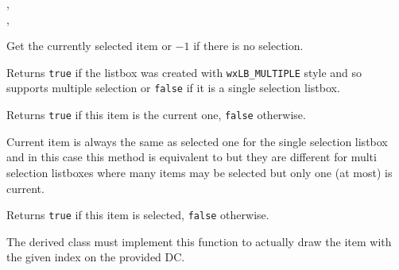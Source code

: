 
,\\
,\\


\label{wxvlistboxgetselection}


Get the currently selected item or $-1$ if there is no selection.


\label{wxvlistboxishasmultipleselection}


Returns {\tt true} if the listbox was created with {\tt wxLB\_MULTIPLE} style
and so supports multiple selection or {\tt false} if it is a single selection
listbox.


\label{wxvlistboxiscurrent}


Returns {\tt true} if this item is the current one, {\tt false} otherwise.

Current item is always the same as selected one for the single selection
listbox and in this case this method is equivalent to 
 but they are different for multi
selection listboxes where many items may be selected but only one (at most) is
current.


\label{wxvlistboxisselected}


Returns {\tt true} if this item is selected, {\tt false} otherwise.


\label{wxvlistboxondrawitem}


The derived class must implement this function to actually draw the item
with the given index on the provided DC.




